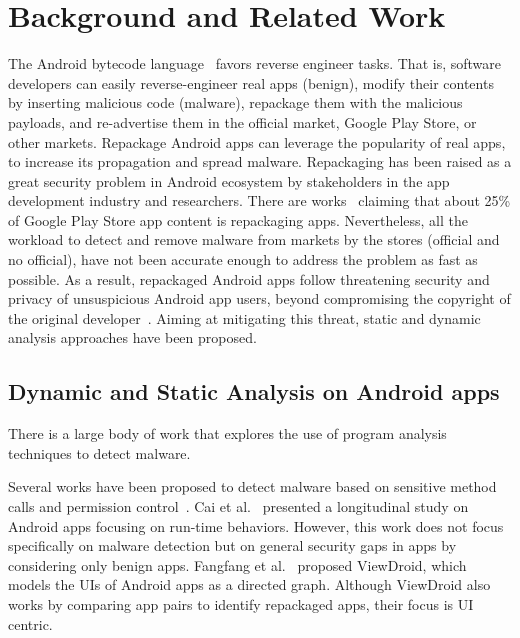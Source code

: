 \section{Background and Related Work}\label{sec:background}


The Android bytecode language~\cite{DBLP:conf/issta/WangGMC15} favors reverse engineer tasks. That is, software developers can easily reverse-engineer real apps (benign), modify their contents by inserting malicious code (malware), repackage them with the malicious payloads, and re-advertise them in the official market, Google Play Store, or other markets. Repackage Android apps can leverage the popularity of real apps, to increase its propagation and spread malware.  
Repackaging has been raised as a great security problem in Android ecosystem by stakeholders in the app development industry and researchers. There are works~\cite{DBLP:conf/sigmetrics/ViennotGN14} claiming that about 25\% of Google Play Store app content is repackaging apps. Nevertheless, all the workload to detect and remove malware from markets by the stores (official and no official), have not been accurate enough to address the problem as fast as possible. As a result, repackaged Android apps follow threatening security and privacy of unsuspicious Android app users, beyond compromising the copyright of the original developer~\cite{DBLP:journals/access/KimLCP19}. Aiming at
mitigating this threat, static and dynamic analysis approaches have been proposed.

\subsection{Dynamic and Static Analysis on Android apps}\label{sec:analysis}

There is a large body of work that explores the use of program analysis techniques to detect malware. 

Several works have been proposed to detect malware based on sensitive method calls and permission control~\cite{DBLP:conf/mobicom/WeiGNF12,DBLP:conf/asiajcis/WuMWLW12,DBLP:conf/sp/LiDLDG21}. Cai et al.~\cite{DBLP:journals/tse/CaiR21} presented a longitudinal study on Android apps focusing on run-time behaviors. However, this work does not focus specifically on malware detection but on general security gaps in apps by considering only benign apps. Fangfang et al.~\cite{DBLP:conf/wisec/ZhangHZW014} proposed ViewDroid, which models the UIs of Android apps as a directed graph. Although ViewDroid also works by comparing app pairs to identify repackaged apps, their focus is UI centric.

